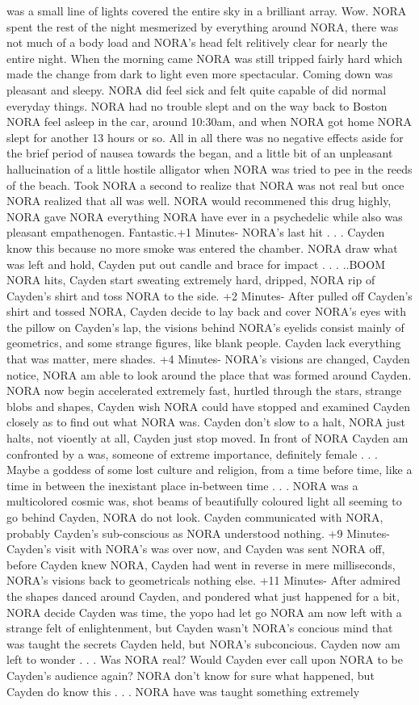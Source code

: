 \documentclass[12pt]{book}
\begin{document}
was a small line of lights covered the entire sky in a brilliant array. Wow. NORA spent the rest of the night mesmerized by everything around NORA, there was not much of a body load and NORA's head felt relitively clear for nearly the entire night. When the morning came NORA was still tripped fairly hard which made the change from dark to light even more spectacular. Coming down was pleasant and sleepy. NORA did feel sick and felt quite capable of did normal everyday things. NORA had no trouble slept and on the way back to Boston NORA feel asleep in the car, around 10:30am, and when NORA got home NORA slept for another 13 hours or so. All in all there was no negative effects aside for the brief period of nausea towards the began, and a little bit of an unpleasant hallucination of a little hostile alligator when NORA was tried to pee in the reeds of the beach. Took NORA a second to realize that NORA was not real but once NORA realized that all was well. NORA would recommened this drug highly, NORA gave NORA everything NORA have ever in a psychedelic while also was pleasant empathenogen. Fantastic.+1 Minutes- NORA's last hit . . .  Cayden know this because no more smoke was entered the chamber. NORA draw what was left and hold, Cayden put out candle and brace for impact . . .  ..BOOM NORA hits, Cayden start sweating extremely hard, dripped, NORA rip of Cayden's shirt and toss NORA to the side. +2 Minutes- After pulled off Cayden's shirt and tossed NORA, Cayden decide to lay back and cover NORA's eyes with the pillow on Cayden's lap, the visions behind NORA's eyelids consist mainly of geometrics, and some strange figures, like blank people. Cayden lack everything that was matter, mere shades. +4 Minutes- NORA's visions are changed, Cayden notice, NORA am able to look around the place that was formed around Cayden. NORA now begin accelerated extremely fast, hurtled through the stars, strange blobs and shapes, Cayden wish NORA could have stopped and examined Cayden closely as to find out what NORA was. Cayden don't slow to a halt, NORA just halts, not vioently at all, Cayden just stop moved. In front of NORA Cayden am confronted by a was, someone of extreme importance, definitely female . . .  Maybe a goddess of some lost culture and religion, from a time before time, like a time in between the inexistant place in-between time . . .  NORA was a multicolored cosmic was, shot beams of beautifully coloured light all seeming to go behind Cayden, NORA do not look. Cayden communicated with NORA, probably Cayden's sub-conscious as NORA understood nothing. +9 Minutes- Cayden's visit with NORA's was over now, and Cayden was sent NORA off, before Cayden knew NORA, Cayden had went in reverse in mere milliseconds, NORA's visions back to geometricals nothing else. +11 Minutes- After admired the shapes danced around Cayden, and pondered what just happened for a bit, NORA decide Cayden was time, the yopo had let go NORA am now left with a strange felt of enlightenment, but Cayden wasn't NORA's concious mind that was taught the secrets Cayden held, but NORA's subconcious. Cayden now am left to wonder . . .  Was NORA real? Would Cayden ever call upon NORA to be Cayden's audience again? NORA don't know for sure what happened, but Cayden do know this . . .  NORA have was taught something extremely 
\end{document}
